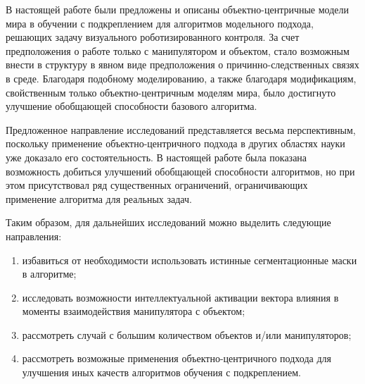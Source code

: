 



В настоящей работе были предложены и описаны объектно-центричные модели мира в обучении с подкреплением для алгоритмов модельного подхода, решающих задачу визуального роботизированного контроля. За счет предположения о работе только с манипулятором и объектом, стало возможным внести в структуру в явном виде предположения о причинно-следственных связях в среде. Благодаря подобному моделированию, а также благодаря модификациям, свойственным только объектно-центричным моделям мира, было достигнуто улучшение обобщающей способности базового алгоритма.

Предложенное направление исследований представляется весьма перспективным, поскольку применение объектно-центричного подхода в других областях науки уже доказало его состоятельность. В настоящей работе была показана возможность добиться улучшений обобщающей способности алгоритмов, но при этом присутствовал ряд существенных ограничений, ограничивающих применение алгоритма для реальных задач.

Таким образом, для дальнейших исследований можно выделить следующие направления:
\begin{enumerate}
    \item избавиться от необходимости использовать истинные сегментационные маски в алгоритме;
    \item исследовать возможности интеллектуальной активации вектора влияния в моменты взаимодействия манипулятора с объектом;
    \item рассмотреть случай с большим количеством объектов и/или манипуляторов;
    \item рассмотреть возможные применения объектно-центричного подхода для улучшения иных качеств алгоритмов обучения с подкреплением.
\end{enumerate}